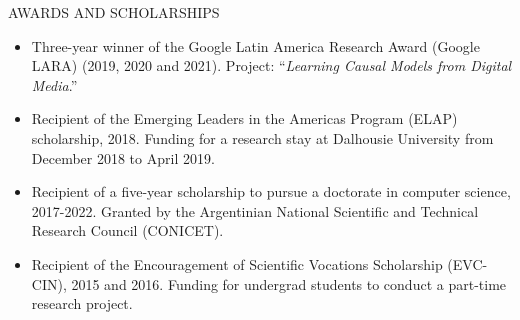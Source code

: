 \documentclass{resume} %
\begin{document}
\begin{rSection}{AWARDS AND SCHOLARSHIPS} 
\begin{itemize}
    \item Three-year winner of the Google Latin America Research Award (Google LARA) (2019, 2020 and 2021). Project: ``\textit{Learning Causal Models from Digital Media}.''
    \item Recipient of the Emerging Leaders in the Americas Program (ELAP) scholarship, 2018. Funding for a research stay at Dalhousie University from December 2018 to April 2019.
    \item Recipient of a five-year scholarship to pursue a doctorate in computer science, 2017-2022. Granted by the Argentinian National Scientific and Technical Research Council (CONICET).
    \item Recipient of the Encouragement of Scientific Vocations Scholarship (EVC-CIN), 2015 and 2016. Funding for undergrad students to conduct a part-time research project.
\end{itemize}

\end{rSection}








 
 

\end{document}
